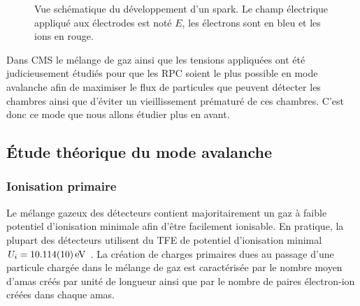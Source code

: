 \begin{figure}[ht!]
    \hfill
	\caption{Vue schématique du développement d'un spark. Le champ électrique appliqué aux électrodes est noté $E$, les électrons sont en bleu et les ions en rouge.}
	\label{spark}
\end{figure}


Dans CMS le mélange de gaz ainsi que les tensions appliquées ont été judicieusement étudiés pour que les RPC soient le plus possible en mode avalanche afin de maximiser le flux de particules que peuvent détecter les chambres ainsi que d'éviter un vieillissement prématuré de ces chambres. C'est donc ce mode que nous allons étudier plus en avant.

\subsection{Étude théorique du mode avalanche}

\subsubsection{Ionisation primaire}
Le mélange gazeux des détecteurs contient majoritairement un gaz à faible potentiel d'ionisation minimale afin d'être facilement ionisable. En pratique, la plupart des détecteurs utilisent du TFE de potentiel d'ionisation minimal $U_{i}=\SI{10.114 \pm0.010}{\eV}$ \cite{Chimie:chimie}. La création de charges primaires dues au passage d'une particule chargée dans le mélange de gaz est caractérisée par le nombre moyen d'amas créés par unité de longueur ainsi que par le nombre de paires électron-ion créées dans chaque amas.


